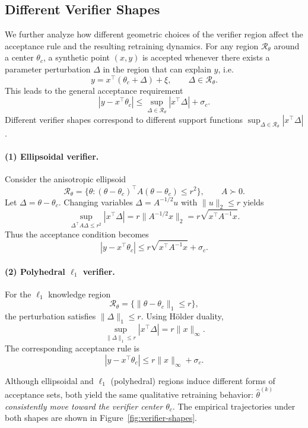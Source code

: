 \subsection{Different Verifier Shapes}\label{sec:verifier_shape}

We further analyze how different geometric choices of the verifier region affect the
acceptance rule and the resulting retraining dynamics.
For any region $\mathcal{R}_\theta$ around a center $\theta_c$, a synthetic point
$(x,y)$ is accepted whenever there exists a parameter perturbation $\Delta$ in the
region that can explain $y$, i.e.
\[
   y = x^\top (\theta_c + \Delta) + \xi, \qquad \Delta \in \mathcal{R}_\theta.
\]
This leads to the general acceptance requirement
\[
   |y - x^\top \theta_c|
   \le \sup_{\Delta \in \mathcal{R}_\theta} |x^\top \Delta| + \sigma_c.
\]
Different verifier shapes correspond to different support functions 
$\sup_{\Delta \in \mathcal{R}_\theta} |x^\top \Delta|$.

\paragraph{(1) Ellipsoidal verifier.}
Consider the anisotropic ellipsoid
\[
    \mathcal{R}_\theta = \bigl\{
        \theta : (\theta - \theta_c)^\top A(\theta - \theta_c) \le r^2
    \bigr\}, \qquad A \succ 0.
\]
Let $\Delta = \theta - \theta_c$.  
Changing variables $\Delta = A^{-1/2}u$ with $\|u\|_2 \le r$ yields
\[
    \sup_{\Delta^\top A \Delta \le r^2} |x^\top \Delta|
    = r\|A^{-1/2}x\|_2
    = r\sqrt{x^\top A^{-1}x}.
\]
Thus the acceptance condition becomes
\[
    |y - x^\top \theta_c|
    \le r\sqrt{x^\top A^{-1}x} + \sigma_c.
\]

\paragraph{(2) Polyhedral $\ell_1$ verifier.}
For the $\ell_1$ knowledge region
\[
    \mathcal{R}_\theta = \{\|\theta - \theta_c\|_1 \le r\},
\]
the perturbation satisfies $\|\Delta\|_1 \le r$.  
Using Hölder duality,
\[
    \sup_{\|\Delta\|_1 \le r} |x^\top \Delta|
    = r\|x\|_\infty.
\]
The corresponding acceptance rule is
\[
    |y - x^\top \theta_c|
    \le r\|x\|_\infty + \sigma_c.
\]

Although ellipsoidal and $\ell_1$ (polyhedral) regions induce different forms of 
acceptance sets, both yield the same qualitative retraining behavior:
\emph{$\hat{\theta}^{(k)}$ consistently move toward the verifier center $\theta_c$}. The empirical trajectories under both shapes are shown in Figure~\ref{fig:verifier-shapes}.

